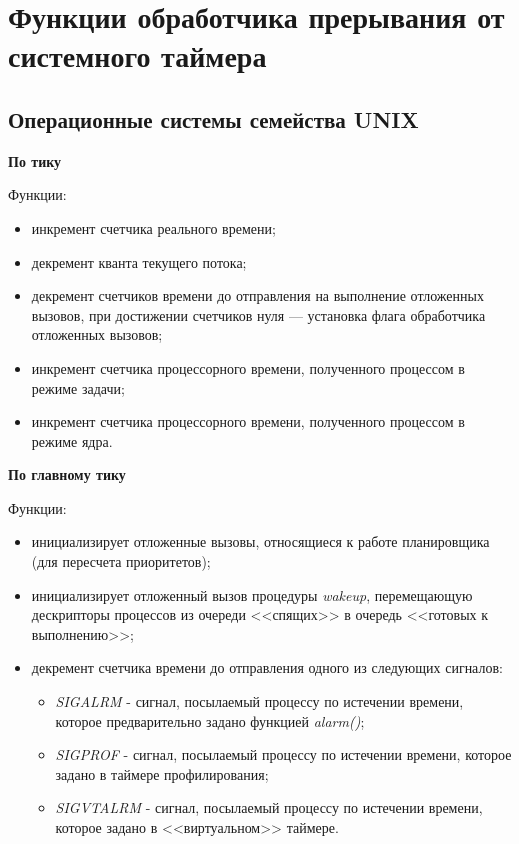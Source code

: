 \section{Функции обработчика прерывания от системного таймера}

\subsection{Операционные системы семейства UNIX}

\textbf{По тику}

Функции:
\begin{itemize}
	\item инкремент счетчика реального времени;
	\item декремент кванта текущего потока;
	\item декремент счетчиков времени до отправления на выполнение отложенных вызовов, при достижении счетчиков нуля --- установка флага обработчика отложенных вызовов;
	\item инкремент счетчика процессорного времени, полученного процессом в режиме задачи;
	\item инкремент счетчика процессорного времени, полученного процессом в режиме ядра.
\end{itemize}

\textbf{По главному тику}

Функции:
\begin{itemize}
	\item инициализирует отложенные вызовы, относящиеся к работе планировщика (для пересчета приоритетов);
	\item инициализирует отложенный вызов процедуры \textit{wakeup}, перемещающую дескрипторы процессов из очереди <<спящих>> в очередь <<готовых к выполнению>>;
	\item декремент счетчика времени до отправления одного из следующих сигналов:
	\begin{itemize}
		\item \textit{SIGALRM} - сигнал, посылаемый процессу по истечении времени, которое предварительно задано функцией \textit{alarm()};
		\item \textit{SIGPROF} - сигнал, посылаемый процессу по истечении времени, которое задано в таймере профилирования;
		\item \textit{SIGVTALRM} - сигнал, посылаемый процессу по истечении времени, которое задано в <<виртуальном>> таймере.
	\end{itemize}
\end{itemize}

